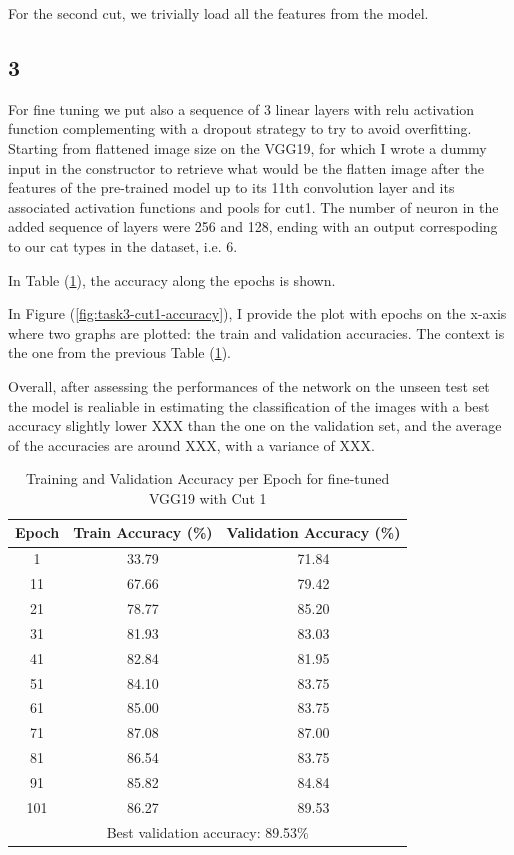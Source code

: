 \documentclass[11pt]{scrartcl}
\begin{document}
For the second cut, we trivially load all the features from the model.


\subsection*{3}

For fine tuning we put also a sequence of 3 linear layers 
with relu activation function complementing 
with a dropout strategy to try to avoid overfitting.
Starting from flattened image size on the VGG19,
for which I wrote a dummy input in the constructor to retrieve what would be the
flatten image after the features of the pre-trained model up to its 11th convolution
layer and its associated activation functions and pools for cut1.
The number of neuron in the added sequence of layers were 256 and 128, 
ending with an output correspoding to our cat types in the dataset, i.e. 6.

In Table (\ref{tab:task3-cut1-accuracy}),
the accuracy along the epochs is shown.

In Figure (\ref{fig:task3-cut1-accuracy}), 
I provide the plot with epochs on the x-axis where two graphs are plotted:
the train and validation accuracies.
The context is the one from the previous Table (\ref{tab:task3-cut1-accuracy}). 

Overall, after assessing the performances of the network on the unseen test set
the model is realiable in estimating the classification of the images with
a best accuracy slightly lower XXX than the one on the validation set,
and the average of the accuracies are around XXX,
with a variance of XXX.

\begin{table}[htbp]
\centering
\caption{Training and Validation Accuracy per Epoch for fine-tuned VGG19 with Cut 1}
\begin{tabular}{ccc}
\toprule
\textbf{Epoch} & \textbf{Train Accuracy (\%)} & \textbf{Validation Accuracy (\%)} \\
\midrule
1    & 33.79 & 71.84 \\
11   & 67.66 & 79.42 \\
21   & 78.77 & 85.20 \\
31   & 81.93 & 83.03 \\
41   & 82.84 & 81.95 \\
51   & 84.10 & 83.75 \\
61   & 85.00 & 83.75 \\
71   & 87.08 & 87.00 \\
81   & 86.54 & 83.75 \\
91   & 85.82 & 84.84 \\
101  & 86.27 & 89.53 \\
\midrule
\multicolumn{3}{c}{Best validation accuracy: 89.53\%} \\
\bottomrule
\end{tabular}
\label{tab:task3-cut1-accuracy}
\end{table}
\end{document}
